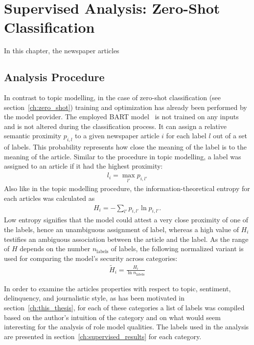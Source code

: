 \renewcommand{\imagepath}{../70-supervised/img}

\chapter{Supervised Analysis: Zero-Shot Classification}\label{ch:supervised}
In this chapter, the newspaper articles 

\section{Analysis Procedure}
In contrast to topic modelling, in the case of zero-shot classification (see section~\ref{ch:zero_shot}) training and optimization has already been performed by the model provider. The employed BART model~\autocite{lewis_bart_2020}  is not trained on any inputs and is not altered during the classification process. It can assign a relative semantic proximity $p_{i, l}$ to a given newspaper article $i$ for each label $l$ out of a set of labels. This probability represents how close the meaning of the label is to the meaning of the article. Similar to the procedure in topic modelling, a label was assigned to an article if it had the highest proximity:
\begin{align}
    l_{i} = \max_{l'} p_{i, l'}
\end{align}
Also like in the topic modelling procedure, the information-theoretical entropy for each articles was calculated as~\autocite{gray_entropy_2013}
\begin{align}
    H_i = -\sum_{l'} p_{i, l'} \ln p_{i, l'}.
\end{align}
Low entropy signifies that the model could attest a very close proximity of one of the labels, hence an unambiguous assignment of label, whereas a high value of $H_i$ testifies an ambiguous association between the article and the label. As the range of $H$ depends on the number $n_\text{labels}$ of labels, the following normalized variant is used for comparing the model's security across categories:
\begin{align}
    \widetilde{H}_i = \frac{H_i}{\ln n_\text{labels}}
\end{align}

In order to examine the articles properties with respect to topic, sentiment, delinquency, and journalistic style, as has been motivated in section~\ref{ch:this_thesis}, for each of these categories a list of labels was compiled based on the author's intuition of the category and on what would seem interesting for the analysis of role model qualities. The labels used in the analysis are presented in section~\ref{ch:supervised_results} for each category.

